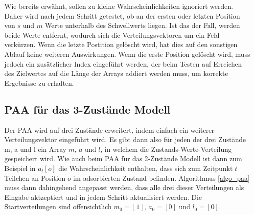 Wie bereits erwähnt, sollen zu kleine Wahrscheinlichkeiten ignoriert werden. Daher wird nach jedem Schritt getestet, ob an der ersten oder letzten Position von $s$ und $m$ Werte unterhalb des Schwellwerts liegen. Ist das der Fall, werden beide Werte entfernt, wodurch sich die Verteilungsvektoren um ein Feld verkürzen. Wenn die letzte Postition gelöscht wird, hat dies auf den sonstigen Ablauf keine weiteren Auswirkungen. Wenn die erste Position gelöscht wird, muss jedoch ein zusätzlicher Index eingeführt werden, der beim Testen auf Erreichen des Zielwertes auf die Länge der Arrays addiert werden muss, um korrekte Ergebnisse zu erhalten.
% 
% 

\subsection{PAA für das 3-Zustände Modell}

Der PAA wird auf drei Zustände erweitert, indem einfach ein weiterer Verteilungsvektor eingeführt wird. Es gibt dann also für jeden der drei Zustände m, a und l ein Array $m$, $a$ und $l$, in welchem die Zustands-Werte-Verteilung gespeichert wird. Wie auch beim PAA für das 2-Zustände Modell ist dann zum Beispiel in $a_t[o]$ die Wahrscheinlichkeit enthalten, dass sich zum Zeitpunkt $t$ Teilchen an Position $o$ im adsorbierten Zustand befinden.
Algorithmus \ref{algo_paa} muss dann dahingehend angepasst werden, dass alle drei dieser Verteilungen als Eingabe aktzeptiert und in jedem Schritt aktualisiert werden.
Die Startverteilungen sind offensichtlich $m_0 = [1]$, $a_0 = [0]$ und $l_0=[0]$. 

